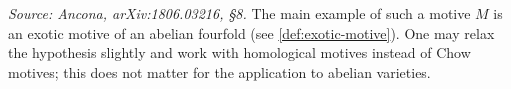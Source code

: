 \begin{remark}
  \label{rem:mainthm-hypotheses}
  \textit{Source: Ancona, arXiv:1806.03216, §8.}
  The main example of such a motive \(M\) is an exotic motive of an abelian
  fourfold (see \cref{def:exotic-motive}). One may relax the hypothesis slightly
  and work with homological motives instead of Chow motives; this does not
  matter for the application to abelian varieties.
\end{remark}

